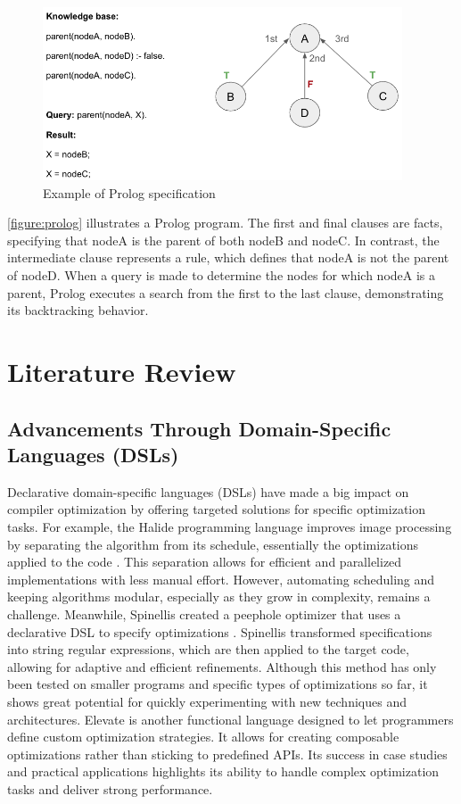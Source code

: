 \begin{figure}[h]
    \includegraphics[width=0.95\textwidth]{Packages/Prolog.png}
    \caption{Example of Prolog specification}
    \label{figure:prolog}
\end{figure}

\autoref{figure:prolog}  illustrates a Prolog program. The first and final clauses are facts, specifying that nodeA is the parent of both nodeB and nodeC. In contrast, the intermediate clause represents a rule, which defines that nodeA is not the parent of nodeD. When a query is made to determine the nodes for which nodeA is a parent, Prolog executes a search from the first to the last clause, demonstrating its backtracking behavior.

\section{Literature Review}

\subsection{Advancements Through Domain-Specific Languages (DSLs)}
Declarative domain-specific languages (DSLs) have made a big impact on compiler optimization by offering targeted solutions for specific optimization tasks. For example, the Halide programming language improves image processing by separating the algorithm from its schedule, essentially the optimizations applied to the code \cite{Jonathan2018}. This separation allows for efficient and parallelized implementations with less manual effort. However, automating scheduling and keeping algorithms modular, especially as they grow in complexity, remains a challenge. Meanwhile, Spinellis created a peephole optimizer that uses a declarative DSL to specify optimizations \cite{Spinellis1999}. Spinellis transformed specifications into string regular expressions, which are then applied to the target code, allowing for adaptive and efficient refinements. Although this method has only been tested on smaller programs and specific types of optimizations so far, it shows great potential for quickly experimenting with new techniques and architectures. Elevate \cite{Hagedorn2020} is another functional language designed to let programmers define custom optimization strategies. It allows for creating composable optimizations rather than sticking to predefined APIs. Its success in case studies and practical applications highlights its ability to handle complex optimization tasks and deliver strong performance.

